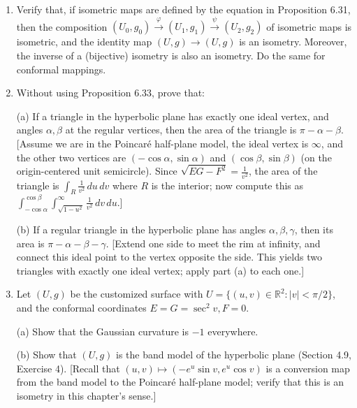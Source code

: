 \documentclass[leqno]{book}
\begin{document}
\begin{enumerate}
(b) If $\theta\ne\pi/2,3\pi/2$, then $\alpha$ is the Euclidean circle centered at $(0,\tan\theta)$ with radius $\sec\theta$.  Conclude that it has radius $r$ and center $a$ such that $r^2-\|a\|^2=1$.

(c) Show that for $|t|<\pi$, $\beta(t)=(\tan(t/2),0)$ is a geodesic, which is a Euclidean line through the origin.

\item Verify that, if isometric maps are defined by the equation in Proposition 6.31, then the composition $(U_0,g_0)\overset{\varphi}{\to}(U_1,g_1)\overset{\psi}{\to}(U_2,g_2)$ of isometric maps is isometric, and the identity map $(U,g)\to(U,g)$ is an isometry.  Moreover, the inverse of a (bijective) isometry is also an isometry.  Do the same for conformal mappings.

\item Without using Proposition 6.33, prove that:

(a) If a triangle in the hyperbolic plane has exactly one ideal vertex, and angles $\alpha,\beta$ at the regular vertices, then the area of the triangle is $\pi-\alpha-\beta$.  [Assume we are in the Poincar\'e half-plane model, the ideal vertex is $\infty$, and the other two vertices are $(-\cos\alpha,\sin\alpha)$ and $(\cos\beta,\sin\beta)$ (on the origin-centered unit semicircle).  Since $\sqrt{EG-F^2}=\frac 1{v^2}$, the area of the triangle is $\int_R\frac 1{v^2}\,du\,dv$ where $R$ is the interior; now compute this as $\int_{-\cos\alpha}^{\cos\beta}\int_{\sqrt{1-u^2}}^\infty\frac 1{v^2}\,dv\,du$.]

(b) If a regular triangle in the hyperbolic plane has angles $\alpha,\beta,\gamma$, then its area is $\pi-\alpha-\beta-\gamma$.  [Extend one side to meet the rim at infinity, and connect this ideal point to the vertex opposite the side.  This yields two triangles with exactly one ideal vertex; apply part (a) to each one.]

\item Let $(U,g)$ be the customized surface with $U=\{(u,v)\in\mathbb R^2:|v|<\pi/2\}$, and the conformal coordinates $E=G=\sec^2v,F=0$.

(a) Show that the Gaussian curvature is $-1$ everywhere.

(b) Show that $(U,g)$ is the band model of the hyperbolic plane (Section 4.9, Exercise 4).  [Recall that $(u,v)\mapsto(-e^u\sin v,e^u\cos v)$ is a conversion map from the band model to the Poincar\'e half-plane model; verify that this is an isometry in this chapter's sense.]


\end{enumerate}
\end{document}

